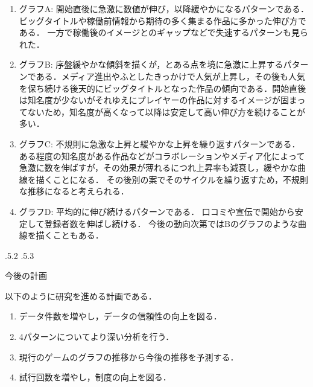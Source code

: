 \documentclass[uplatex]{jsarticle}
\makeatletter
\renewcommand{\section}{%
    \if@slide\clearpage\fi
    \@startsection{section}{1}{\z@}%
    {\Cvs \@plus.5\Cdp \@minus.2\Cdp}%
    {.5\Cvs \@plus.3\Cdp}%
    {\normalfont\raggedright}}
\makeatother
\begin{document}
\begin{enumerate}
\item グラフA:
開始直後に急激に数値が伸び，以降緩やかになるパターンである．
ビッグタイトルや稼働前情報から期待の多く集まる作品に多かった伸び方である．
一方で稼働後のイメージとのギャップなどで失速するパターンも見られた．

\item グラフB:
序盤緩やかな傾斜を描くが，とある点を境に急激に上昇するパターンである．メディア進出やふとしたきっかけで人気が上昇し，その後も人気を保ち続ける後天的にビッグタイトルとなった作品の傾向である．開始直後は知名度が少ないがそれゆえにプレイヤーの作品に対するイメージが固まってないため，知名度が高くなって以降は安定して高い伸び方を続けることが多い．

\item グラフC:
不規則に急激な上昇と緩やかな上昇を繰り返すパターンである．
ある程度の知名度がある作品などがコラボレーションやメディア化によって急激に数を伸ばすが，その効果が薄れるにつれ上昇率も減衰し，緩やかな曲線を描くことになる．
その後別の案でそのサイクルを繰り返すため，不規則な推移になると考えられる．

\item グラフD:
平均的に伸び続けるパターンである．
口コミや宣伝で開始から安定して登録者数を伸ばし続ける．
今後の動向次第ではBのグラフのような曲線を描くこともある．

\end{enumerate}









\section{今後の計画}

以下のように研究を進める計画である．

\begin{enumerate}
\item データ件数を増やし，データの信頼性の向上を図る．
\item 4パターンについてより深い分析を行う．
\item 現行のゲームのグラフの推移から今後の推移を予測する．
\item 試行回数を増やし，制度の向上を図る．
\end{enumerate}



\end{document}
